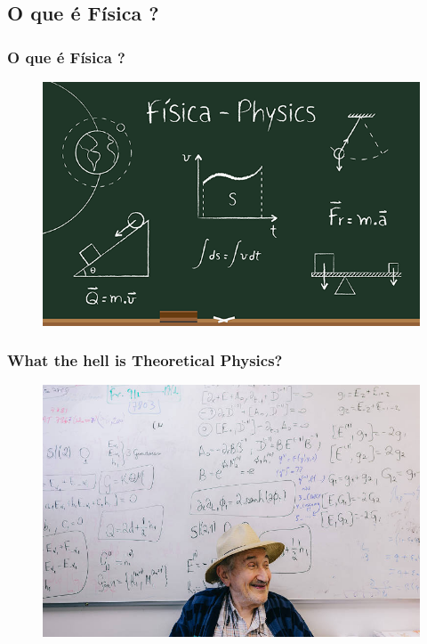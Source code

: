 \documentclass{beamer}
\begin{document}
	\begin{frame}
	\section{O que é Física ?}
		\frametitle{O que é Física ?}
		\begin{figure}[h]
			\centering
			\includegraphics[scale=0.5]{physics.png}
			\label{What a hell is physics ?}
		\end{figure}
	\end{frame}

	\begin{frame}
		\frametitle{What the hell is Theoretical Physics?}
		\begin{figure}[h]
			\centering
			\includegraphics[scale=1.6]{teorica.jpg}
		\end{figure}
	\end{frame}
	
\end{document}
